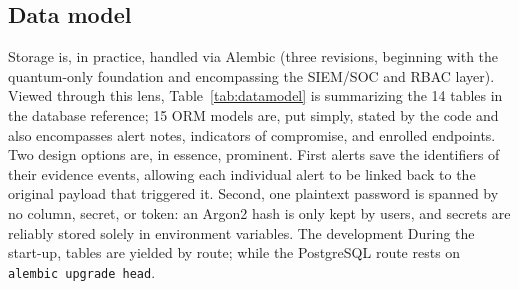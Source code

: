 \documentclass[conference]{IEEEtran}
\newcommand{\code}[1]{\texttt{#1}}
\begin{document}
\subsection{Data model}
Storage is, in practice, handled via Alembic (three revisions, beginning with the quantum-only foundation and encompassing the SIEM/SOC and RBAC layer). Viewed through this lens, Table~\ref{tab:datamodel} is summarizing the 14 tables in the database reference; 15 ORM models are, put simply, stated by the code and also encompasses alert notes, indicators of compromise, and enrolled endpoints. Two design options are, in essence, prominent. First alerts save the identifiers of their evidence events, allowing each individual alert to be linked back to the original payload that triggered it. Second, one plaintext password is spanned by no column, secret, or token: an Argon2 hash is only kept by users, and secrets are reliably stored solely in environment variables. The development During the start-up, tables are yielded by route; while the PostgreSQL route rests on \code{alembic upgrade head}.
\end{document}
